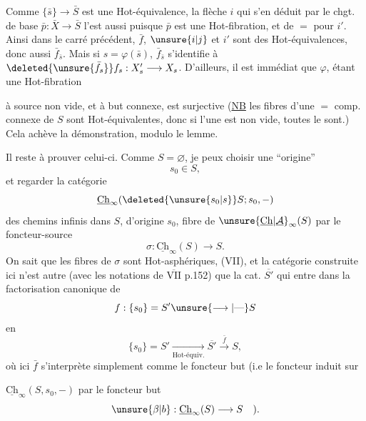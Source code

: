 Comme $\{\bar s\}\longrightarrow\bar S$ est une Hot-équivalence,
la flèche $i$ qui s'en déduit par le chgt.
de base $\bar p:\bar X\to\bar S$ l'est aussi puisque $\bar p$
est une Hot-fibration, et de $=$ pour
$i'$. Ainsi dans le carré  précédent, $\bar f$,
$\unsure{i|j}$ et $i'$ sont des Hot-équivalences, donc aussi
$\bar f_{\bar s}$. Mais  si $s=\varphi(\bar s)$, $\bar f_{\bar s}$ s'identifie
à $\deleted{\unsure{\bar f_s}}f_s:X'_s\longrightarrow X_s$. D'ailleurs, il est
immédiat que  $\varphi$, étant une Hot-fibration


à source non vide, et à but connexe, est surjective
(\uline{NB}  les fibres d'une $=$ comp. connexe
de $S$ sont Hot-équivalentes\deleted{\unsure{)}}, donc si l'une est non
vide, toutes le sont.) Cela achève la démonstration, modulo le lemme.

Il reste à prouver celui-ci. Comme $S=\varnothing$, je
peux choisir une ``origine''
\[
s_0\in S,
\]
et regarder la catégorie
\[
\underline{\mathrm{Ch}}_{\infty}(\deleted{\unsure{s_0|s}}S;s_0,-)
\]
des chemins infinis dans $S$, d'origine $s_0$, fibre
de $\unsure{\underline{\mathrm{Ch}}|\underline{\mathcal A}}_{\infty}(S)$ par le foncteur-source \deleted{\unsure{$\sigma$}}
\[
\sigma:\underline{\mathrm{Ch}}_{\infty}(S)\longrightarrow S.
\]
On sait que les fibres de $\sigma$ sont Hot-asphériques,
(VII), et la catégorie construite ici n'est
autre  (avec les notations de \uline{$\overline{\mathrm{VII}}$} p.152) que
la  cat. $\overline{S'}$ qui entre dans la factorisation
canonique de
\[
f:\{s_0\}=S'\unsure{\longrightarrow|\text{---}}S
\]
en
\[
\{s_0\}=S'\xrightarrow[\text{Hot-équiv.}]{}\overline{S'}
 \xrightarrow{\bar f} S,
\]
où ici $\bar f$ s'interprète simplement comme
le foncteur but (i.e le foncteur induit sur


$\underline{\mathrm{Ch}}_{\infty}(S,s_0,-)$ par le foncteur but
\[
\unsure{\beta|b}:\underline{\mathrm{Ch}}_{\infty}(S)\longrightarrow S\quad).
\]

